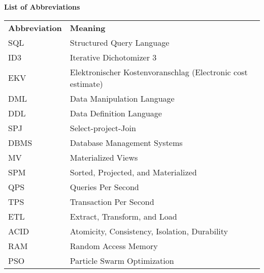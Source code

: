 
% 
\thispagestyle{empty}
\begin{center}
    \huge\textbf{List of Abbreviations}
\end{center}  \vspace{.4cm}

\noindent %
\begin{minipage}{\textwidth}
\begin{tabular}{ll}
    \textbf{Abbreviation} & \textbf{Meaning}\\
    SQL & Structured Query Language\\
    ID3 & Iterative  Dichotomizer 3\\
    EKV & Elektronischer Kostenvoranschlag (Electronic cost estimate)\\
    DML & Data Manipulation Language \\
    DDL & Data Definition Language \\
    SPJ & Select-project-Join \\
    DBMS & Database Management Systems \\
    MV & Materialized Views \\
    SPM & Sorted, Projected, and Materialized \\
    QPS & Queries Per Second \\
    TPS & Transaction Per Second \\
    ETL & Extract, Transform, and Load \\
    ACID & Atomicity, Consistency, Isolation, Durability \\
    RAM & Random Access Memory \\
    PSO & Particle Swarm Optimization \\
\end{tabular}
\end{minipage}
% 

    